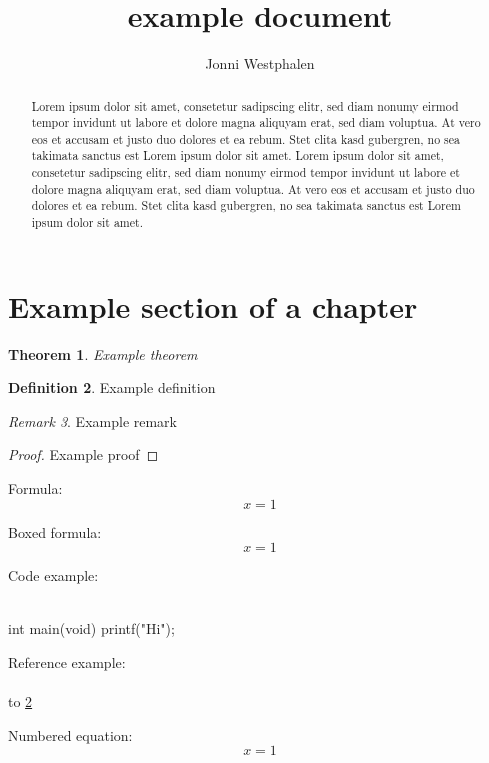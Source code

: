 \documentclass[11pt,twoside,final,a4paper]{amsart}
\title{example document}
\author[J. Westphalen]{Jonni Westphalen}
\theoremstyle{plain}
\newtheorem{theorem}{Theorem}[section]
\theoremstyle{definition}
\newtheorem{definition}[theorem]{Definition}
\theoremstyle{remark}
\newtheorem{remark}[theorem]{Remark}
\numberwithin{equation}{theorem}
\begin{document}
\maketitle

\begin{abstract}
    Lorem ipsum dolor sit amet, consetetur sadipscing elitr, sed diam nonumy eirmod tempor invidunt ut labore et dolore magna aliquyam erat, sed diam voluptua. At vero eos et accusam et justo duo dolores et ea rebum. Stet clita kasd gubergren, no sea takimata sanctus est Lorem ipsum dolor sit amet. Lorem ipsum dolor sit amet, consetetur sadipscing elitr, sed diam nonumy eirmod tempor invidunt ut labore et dolore magna aliquyam erat, sed diam voluptua. At vero eos et accusam et justo duo dolores et ea rebum. Stet clita kasd gubergren, no sea takimata sanctus est Lorem ipsum dolor sit amet.
\end{abstract}

\tableofcontents \newpage

\section{Example section of a chapter}

\begin{theorem}
Example theorem
\end{theorem}

\begin{definition}\label{112}
Example definition
\end{definition}

\begin{remark}
Example remark
\end{remark}

\begin{proof}
Example proof
\end{proof}

Formula:
$$x = 1$$

Boxed formula:
$$\boxed{x = 1}$$


Code example:\\
\\
\begin{myC}
int main(void) {
    printf("Hi");
}
\end{myC}

Reference example:\\
\\
to \ref{112}

Numbered equation:\\
\begin{equation}
    x = 1
\end{equation}
\end{document}
